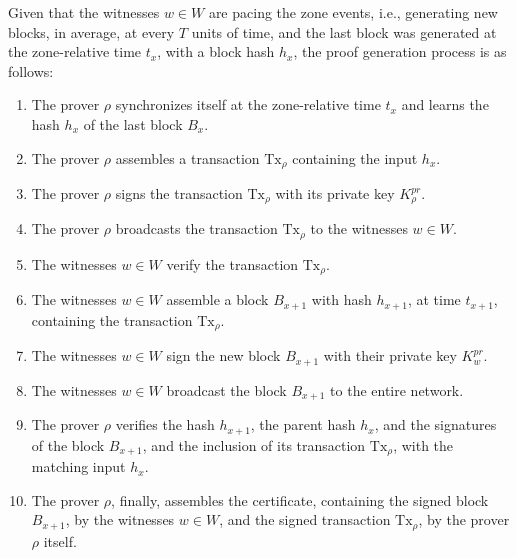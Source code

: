 Given that the witnesses $w \in W$ are pacing the zone events, i.e., generating new blocks, in average, at every $T$ units of time, and the last block was generated at the zone-relative time $t_x$, with a block hash $h_x$, the proof generation process is as follows:

\begin{enumerate}
    \item The prover $\rho$ synchronizes itself at the zone-relative time $t_x$ and learns the hash  $h_x$ of the last block $B_{x}$.
    \item The prover $\rho$ assembles a transaction $\text{Tx}_\rho$ containing the input $h_x$.
    \item The prover $\rho$ signs the transaction $\text{Tx}_\rho$ with its private key $K^{pr}_\rho$.
    \item The prover $\rho$ broadcasts the transaction $\text{Tx}_\rho$ to the witnesses $w \in W$.
    \item The witnesses $w \in W$ verify the transaction $\text{Tx}_\rho$.
    \item The witnesses $w \in W$ assemble a block $B_{x+1}$ with hash $h_{x+1}$, at time $t_{x+1}$, containing the transaction $\text{Tx}_\rho$.
    \item The witnesses $w \in W$ sign the new block $B_{x+1}$ with their private key $K^{pr}_w$.
    \item The witnesses $w \in W$ broadcast the block $B_{x+1}$ to the entire network.
    \item The prover $\rho$ verifies the hash $h_{x+1}$, the parent hash $h_{x}$, and the signatures of the block $B_{x+1}$, and the inclusion of its transaction $\text{Tx}_\rho$, with the matching input $h_{x}$.
    \item The prover $\rho$, finally, assembles the \pol{} certificate, containing the signed block $B_{x+1}$, by the witnesses $w \in W$, and the signed transaction $\text{Tx}_\rho$, by the prover $\rho$ itself.
\end{enumerate}

